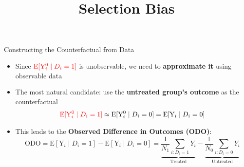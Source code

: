 \documentclass[hyperref={pdfpagelabels=false}]{beamer}
\begin{document}
\begin{frame}{Constructing the Counterfactual from Data}
	\begin{itemize}
		\item Since ${\color{red}\mathrm{E}[\mathrm{Y}^{0}_{i} \mid D_i=1]}$ is unobservable, we need to \textbf{approximate it} using observable data
		\vspace{0.2cm}
		\item The most natural candidate: use the \textbf{untreated group's outcome} as the counterfactual
		\begin{equation*}
			{\color{red}\mathrm{E}[\mathrm{Y}^{0}_{i} \mid D_i=1]} \approx \mathrm{E}[\mathrm{Y}^{0}_{i} \mid D_i=0] = \mathrm{E}[\mathrm{Y}_{i} \mid D_i=0]
		\end{equation*}
		\vspace{0.1cm}
		\item This leads to the \textbf{Observed Difference in Outcomes (ODO)}:
		\begin{equation*}
			\text{ODO} = \mathrm{E}[\mathrm{Y}_{i} \mid D_i=1] - \mathrm{E}[\mathrm{Y}_{i} \mid D_i=0]
			= \underbrace{\dfrac{1}{N_1} \sum_{i:D_i=1} Y_i}_{\text{Treated}} - \underbrace{\dfrac{1}{N_0} \sum_{i:D_i=0} Y_i}_{\text{Untreated}}
		\end{equation*}
		
	\end{itemize}
\end{frame}



	

\title[]  
{Selection Bias}


\author 
{}

\institute{}






\date
{}


\begin{frame}{}
	\titlepage
\end{frame}
	
	
	
\end{document}
